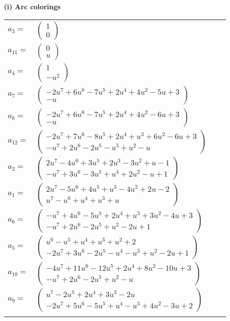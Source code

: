 \documentclass[1p]{elsarticle_modified}
\theoremstyle{definition}
\begin{document}
\flushleft \textbf{(i) Arc colorings}\\
\begin{tabular}{m{7pt} m{180pt} m{7pt} m{180pt} }
\flushright $a_{3}=$&$\begin{pmatrix}1\\0\end{pmatrix}$ \\
\flushright $a_{11}=$&$\begin{pmatrix}0\\u\end{pmatrix}$ \\
\flushright $a_{4}=$&$\begin{pmatrix}1\\- u^2\end{pmatrix}$ \\
\flushright $a_{7}=$&$\begin{pmatrix}-2 u^7+6 u^6-7 u^5+2 u^4+4 u^2-5 u+3\\- u\end{pmatrix}$ \\
\flushright $a_{8}=$&$\begin{pmatrix}-2 u^7+6 u^6-7 u^5+2 u^4+4 u^2-6 u+3\\- u\end{pmatrix}$ \\
\flushright $a_{12}=$&$\begin{pmatrix}-2 u^7+7 u^6-8 u^5+2 u^4+u^3+6 u^2-6 u+3\\- u^7+2 u^6-2 u^5- u^3+u^2- u\end{pmatrix}$ \\
\flushright $a_{2}=$&$\begin{pmatrix}2 u^7-4 u^6+3 u^5+2 u^3-3 u^2+u-1\\- u^7+3 u^6-3 u^5+u^4+2 u^2- u+1\end{pmatrix}$ \\
\flushright $a_{1}=$&$\begin{pmatrix}2 u^7-5 u^6+4 u^5+u^3-4 u^2+2 u-2\\u^7- u^6+u^4+u^3+u\end{pmatrix}$ \\
\flushright $a_{6}=$&$\begin{pmatrix}- u^7+4 u^6-5 u^5+2 u^4+u^3+3 u^2-4 u+3\\- u^7+2 u^6-2 u^5+u^2-2 u+1\end{pmatrix}$ \\
\flushright $a_{5}=$&$\begin{pmatrix}u^6- u^5+u^4+u^3+u^2+2\\-2 u^7+3 u^6-2 u^5- u^4- u^3+u^2-2 u+1\end{pmatrix}$ \\
\flushright $a_{10}=$&$\begin{pmatrix}-4 u^7+11 u^6-12 u^5+2 u^4+8 u^2-10 u+3\\- u^7+2 u^6-2 u^5+u^2- u\end{pmatrix}$ \\
\flushright $a_{9}=$&$\begin{pmatrix}u^7-2 u^5+2 u^4+3 u^3-2 u\\-2 u^7+5 u^6-5 u^5+u^4- u^3+4 u^2-3 u+2\end{pmatrix}$\\&\end{tabular}
\end{document}
